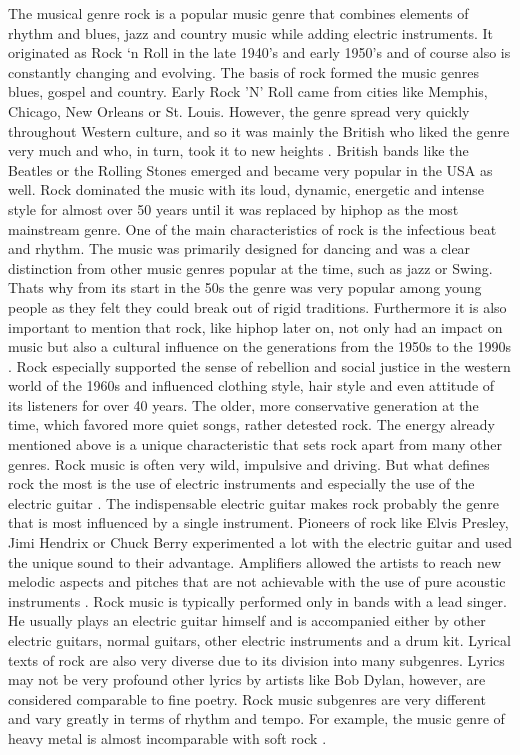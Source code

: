 The musical genre rock is a popular music genre that combines elements of rhythm and blues,
jazz and country music while adding electric instruments.
It originated as Rock `n Roll in the late 1940's and early 1950's and of course also is constantly
changing and evolving.
The basis of rock formed the music genres blues, gospel and country.
Early Rock 'N' Roll came from cities like Memphis, Chicago, New Orleans or St. Louis.
However, the genre spread very quickly throughout Western culture, and so it was mainly
the British who liked the genre very much and who, in turn, took it to new heights \cite{2021MasterclassRock}.
British bands like the Beatles or the Rolling Stones emerged and became very popular in the USA as well.
Rock dominated the music with its loud, dynamic, energetic and intense style for almost over
50 years until it was replaced by hiphop as the most mainstream genre.
One of the main characteristics of rock is the infectious beat and rhythm.
The music was primarily designed for dancing and was a clear distinction from other music genres
popular at the time, such as jazz or Swing.
Thats why from its start in the 50s the genre was very popular among young people as they felt
they could break out of rigid traditions.
Furthermore it is also important to mention that rock, like hiphop later on,
not only had an impact on music but also a cultural influence on the generations
from the 1950s to the 1990s \cite{2021MasterclassRock}. Rock especially supported the sense of rebellion and social
justice in the western world of the 1960s and influenced clothing style,
hair style and even attitude of its listeners for over 40 years.
The older, more conservative generation at the time, which favored more quiet songs,
rather detested rock.
The energy already mentioned above is a unique characteristic that sets rock apart
from many other genres. Rock music is often very wild, impulsive and driving.
But what defines rock the most is the use of electric instruments and especially
the use of the electric guitar \cite{MusicalDictRock}.
The indispensable electric guitar makes rock probably the genre that is most
influenced by a single instrument. Pioneers of rock like Elvis Presley,
Jimi Hendrix or Chuck Berry experimented a lot with the electric guitar
and used the unique sound to their advantage.
Amplifiers allowed the artists to reach new melodic aspects and pitches that are not achievable
with the use of pure acoustic instruments \cite{MusicalDictRock}. Rock music is typically performed only in bands with a lead singer.
He usually plays an electric guitar himself and is accompanied either by other electric guitars,
normal guitars, other electric instruments and a drum kit.
Lyrical texts of rock are also very diverse due to its division into many subgenres.
Lyrics may not be very profound other lyrics by artists like Bob Dylan, however,
are considered comparable to fine poetry.
Rock music subgenres are very different and vary greatly in terms of rhythm and tempo.
For example, the music genre of heavy metal is almost incomparable with soft rock \cite{Clark2021}.